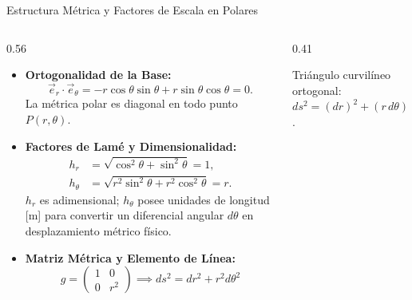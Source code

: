 \documentclass[10pt,aspectratio=169]{beamer}
\begin{document}
\begin{frame}{Estructura Métrica y Factores de Escala en Polares}
  \begin{columns}[c]
    \begin{column}{0.56\textwidth}
      \footnotesize
      \begin{itemize}\itemsep3pt
        \item \textbf{Ortogonalidad de la Base:}
        \[
        \vec{e}_r \cdot \vec{e}_\theta = -r\cos\theta\sin\theta + r\sin\theta\cos\theta = 0.
        \]
        La métrica polar es diagonal en todo punto $P(r,\theta)$.
        \item \textbf{Factores de Lamé y Dimensionalidad:}
        \begin{align*}
          h_r &= \sqrt{\cos^2\theta + \sin^2\theta} = 1, \\
          h_\theta &= \sqrt{r^2\sin^2\theta + r^2\cos^2\theta} = r.
        \end{align*}
        $h_r$ es adimensional; $h_\theta$ posee unidades de longitud [m] para convertir un diferencial angular $d\theta$ en desplazamiento métrico físico.
        \item \textbf{Matriz Métrica y Elemento de Línea:}
        \[
        g = \begin{pmatrix} 1 & 0 \\ 0 & r^2 \end{pmatrix} \implies \boxed{ds^2 = dr^2 + r^2 d\theta^2}
        \]
      \end{itemize}
    \end{column}
    \begin{column}{0.41\textwidth}
      \centering
      \vspace{0.1cm}
      {\scriptsize Triángulo curvilíneo ortogonal: $ds^2 = (dr)^2 + (r\,d\theta)^2$.}
    \end{column}
  \end{columns}
\end{frame}
\end{document}
